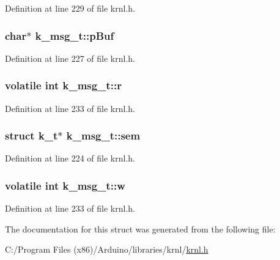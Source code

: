 Definition at line 229 of file krnl.\+h.

\hypertarget{structk__msg__t_ac1285a0d8e7c3925b8f7671d92553ef7}{}
\subsubsection[{p\+Buf}]{\setlength{\rightskip}{0pt plus 5cm}char$\ast$ k\+\_\+msg\+\_\+t\+::p\+Buf}\label{structk__msg__t_ac1285a0d8e7c3925b8f7671d92553ef7}


Definition at line 227 of file krnl.\+h.

\hypertarget{structk__msg__t_aac75863785b0f241b90e49b440f9cd4a}{}
\subsubsection[{r}]{\setlength{\rightskip}{0pt plus 5cm}volatile int k\+\_\+msg\+\_\+t\+::r}\label{structk__msg__t_aac75863785b0f241b90e49b440f9cd4a}


Definition at line 233 of file krnl.\+h.

\hypertarget{structk__msg__t_abc38d50a3f77336df86ddc6a55665c0e}{}
\subsubsection[{sem}]{\setlength{\rightskip}{0pt plus 5cm}struct {\bf k\+\_\+t}$\ast$ k\+\_\+msg\+\_\+t\+::sem}\label{structk__msg__t_abc38d50a3f77336df86ddc6a55665c0e}


Definition at line 224 of file krnl.\+h.

\hypertarget{structk__msg__t_ad7653be9d894a288d863062258a6c467}{}
\subsubsection[{w}]{\setlength{\rightskip}{0pt plus 5cm}volatile int k\+\_\+msg\+\_\+t\+::w}\label{structk__msg__t_ad7653be9d894a288d863062258a6c467}


Definition at line 233 of file krnl.\+h.



The documentation for this struct was generated from the following file\+:\begin{DoxyCompactItemize}
\item 
C\+:/\+Program Files (x86)/\+Arduino/libraries/krnl/\hyperlink{krnl_8h}{krnl.\+h}\end{DoxyCompactItemize}
